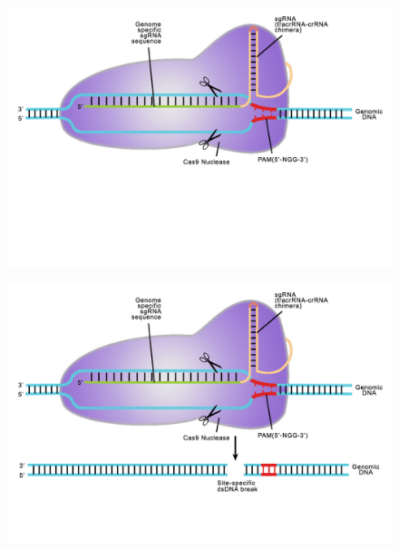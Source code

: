 \documentclass[Nike]{tuberlinbeamer}
\begin{document}
\begin{frame}
  \begin{figure}
    \includegraphics[width=0.85\linewidth,left]{Doudna-art-crop-upper.jpg}
  \end{figure}
\end{frame}


\begin{frame}
  \begin{figure}
    \includegraphics[width=0.85\linewidth,left]{Doudna-art-crop.jpg}
  \end{figure}
\end{frame}

\end{document}
